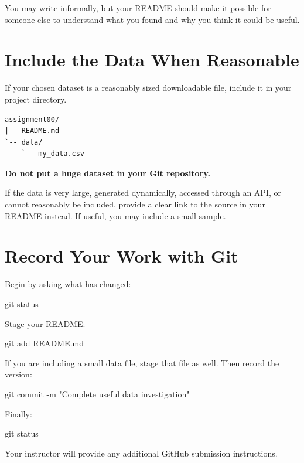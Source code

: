 \documentclass[11pt]{article}
\begin{document}
You may write informally, but your README should make it possible for someone
else to understand what you found and why you think it could be useful.

\section{Include the Data When Reasonable}

If your chosen dataset is a reasonably sized downloadable file, include it in
your project directory.

\begin{verbatim}
assignment00/
|-- README.md
`-- data/
    `-- my_data.csv
\end{verbatim}

\begin{checkpoint}
\textbf{Do not put a huge dataset in your Git repository.}

If the data is very large, generated dynamically, accessed through an API, or
cannot reasonably be included, provide a clear link to the source in your
README instead. If useful, you may include a small sample.
\end{checkpoint}

\section{Record Your Work with Git}

Begin by asking what has changed:

\begin{terminal}
git status
\end{terminal}

Stage your README:

\begin{terminal}
git add README.md
\end{terminal}

If you are including a small data file, stage that file as well. Then record
the version:

\begin{terminal}
git commit -m "Complete useful data investigation"
\end{terminal}

Finally:

\begin{terminal}
git status
\end{terminal}

Your instructor will provide any additional GitHub submission instructions.
\end{document}
